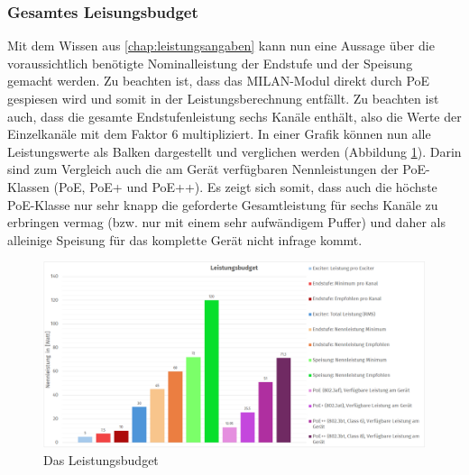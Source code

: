 \subsubsection{Gesamtes Leisungsbudget}
Mit dem Wissen aus \ref{chap:leistungsangaben} kann nun eine Aussage über die voraussichtlich benötigte Nominalleistung der Endstufe und der Speisung gemacht werden. {\color{red} Zu beachten ist, dass das MILAN-Modul direkt durch PoE gespiesen wird und somit in der Leistungsberechnung entfällt.} Zu beachten ist auch, dass die gesamte Endstufenleistung sechs Kanäle enthält, also die Werte der Einzelkanäle mit dem Faktor 6 multipliziert. In einer Grafik können nun alle Leistungswerte als Balken dargestellt und verglichen werden (Abbildung \ref{pic:Leistungsbudget}). Darin sind zum Vergleich auch die am Gerät verfügbaren Nennleistungen der PoE-Klassen (PoE, PoE+ und PoE++). Es zeigt sich somit, dass auch die höchste PoE-Klasse nur sehr knapp die geforderte Gesamtleistung für sechs Kanäle zu erbringen vermag (bzw. nur mit einem sehr aufwändigem Puffer) und daher als alleinige Speisung für das komplette Gerät nicht infrage kommt.
\begin{figure}[H]
	\centering
	\includegraphics[width=\textwidth]{pictures/Leistungsbudget.pdf}
	\caption{Das Leistungsbudget}
	\label{pic:Leistungsbudget}
\end{figure}
